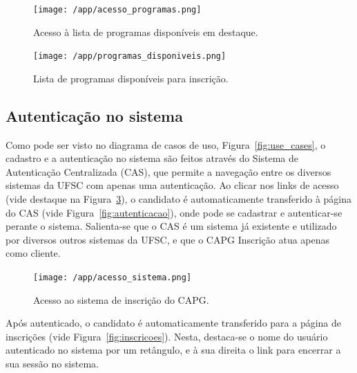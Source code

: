 \documentclass[
  10.5pt,				  %
	openright,			%
	twoside,			  %
  a5paper,
  chapter=TITLE,	%
	section=TITLE,	%
  hyphens,        %
	english,        %
	brazil          %
]{abntex2}
\begin{document}
\begin{figure}[!ht]
  \caption{\label{fig:acesso_programas} Acesso à lista de programas disponíveis em destaque. }
  \begin{center}
    \texttt{[image: /app/acesso\_programas.png]}
  \end{center}
\end{figure}



\begin{figure}[!ht]
  \caption{\label{fig:programas_disponiveis} Lista de programas disponíveis para inscrição. }
  \begin{center}
    \texttt{[image: /app/programas\_disponiveis.png]}
  \end{center}
\end{figure}




\subsection{Autenticação no sistema}\label{sec:autenticacao}
Como pode ser visto no diagrama de casos de uso, Figura~\ref{fig:use_cases}, o cadastro e a autenticação no sistema são feitos através do Sistema de Autenticação Centralizada (CAS), que permite a navegação entre os diversos sistemas da UFSC com apenas uma autenticação. Ao clicar nos links de acesso (vide destaque na Figura~\ref{fig:acesso_sistema}), o candidato é automaticamente transferido à página do CAS (vide Figura~\ref{fig:autenticacao}), onde pode se cadastrar e autenticar-se perante o sistema. Salienta-se que o CAS é um sistema já existente e utilizado por diversos outros sistemas da UFSC, e que o CAPG Inscrição atua apenas como cliente.


\begin{figure}[!ht]
  \caption{\label{fig:acesso_sistema} Acesso ao sistema de inscrição do CAPG. }
  \begin{center}
    \texttt{[image: /app/acesso\_sistema.png]}
  \end{center}
\end{figure}

Após autenticado, o candidato é automaticamente transferido para a página de inscrições (vide Figura~\ref{fig:inscricoes}). Nesta, destaca-se o nome do usuário autenticado no sistema por um retângulo, e à sua direita o link para encerrar a sua sessão no sistema.
\end{document}
